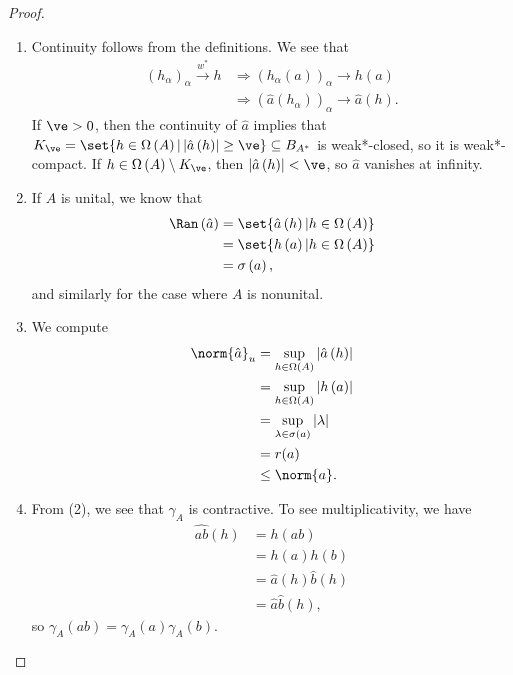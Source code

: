 \documentclass[10pt]{mypackage}
\begin{document}
\begin{proof}\hfill
  \begin{enumerate}[(1)]
    \item Continuity follows from the definitions. We see that
      \begin{align*}
        \left(h_{\alpha}\right)_{\alpha}\xrightarrow{w^{\ast}}h &\Rightarrow \left(h_{\alpha}\left(a\right)\right)_{\alpha}\rightarrow h\left(a\right)\\
                                                                &\Rightarrow \left(\hat{a}\left(h_{\alpha}\right)\right)_{\alpha}\rightarrow \hat{a}\left(h\right).
      \end{align*}
      If $\ve > 0$, then the continuity of $\hat{a}$ implies that $K_{\ve} = \set{h\in \Omega\left(A\right) | \left\vert \hat{a}\left(h\right) \right\vert\geq \ve}\subseteq B_{A^{\ast}}$ is weak*-closed, so it is weak*-compact. If $h\in \Omega\left(A\right)\setminus K_{\ve}$, then $\left\vert \hat{a}\left(h\right) \right\vert < \ve$, so $\hat{a}$ vanishes at infinity.
    \item If $A$ is unital, we know that
      \begin{align*}
        \Ran\left(\hat{a}\right) &= \set{\hat{a}\left(h\right) | h\in \Omega\left(A\right)}\\
                                 &= \set{h\left(a\right) | h\in \Omega\left(A\right)}\\
                                 &= \sigma\left(a\right),
      \end{align*}
      and similarly for the case where $A$ is nonunital.
    \item We compute
      \begin{align*}
        \norm{\hat{a}}_u &= \sup_{h\in\Omega\left(A\right)}\left\vert \hat{a}\left(h\right) \right\vert\\
                         &= \sup_{h\in\Omega\left(A\right)} \left\vert h\left(a\right) \right\vert\\
                         &= \sup_{\lambda\in\sigma\left(a\right)}\left\vert \lambda \right\vert\\
                         &= r(a)\\
                         &\leq \norm{a}.
      \end{align*}
    \item From (2), we see that $\gamma_{A}$ is contractive. To see multiplicativity, we have
      \begin{align*}
        \widehat{ab}\left(h\right) &= h\left(ab\right)\\
                                   &= h\left(a\right)h\left(b\right)\\
                                   &= \hat{a}\left(h\right)\hat{b}\left(h\right)\\
                                   &= \hat{a}\hat{b}\left(h\right),
      \end{align*}
      so $\gamma_A\left(ab\right) = \gamma_A\left(a\right)\gamma_A\left(b\right)$.
  \end{enumerate}
\end{proof}
\end{document}
